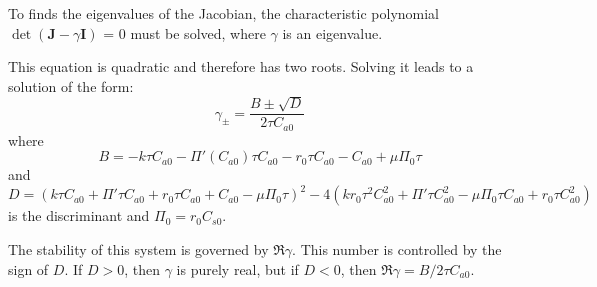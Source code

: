 To finds the eigenvalues of the Jacobian, the characteristic polynomial $\det(\bm{J} - \gamma \bm{I})$ = 0 must be solved, where $\gamma$ is an eigenvalue.

This equation is quadratic and therefore has two roots. Solving it leads to a solution of the form:
\begin{equation}
  \label{eq:eigenvalues_of_one_box_jac}
  \gamma_{\pm} = \frac{B \pm \sqrt{D}}{2\tau C_{a0}}
\end{equation}
where
\begin{equation}
  \label{eq:B_in_one_box}
  B = -k \tau  C_{a0}-\Pi'(C_{a0}) \tau  C_{a0}-r_0 \tau  C_{a0}-C_{a0}+\mu  \Pi_0 \tau
\end{equation}
and
\begin{equation}
  \label{eq:discriminant_from_one_box}
  D = \left(k \tau  C_{a0} +\Pi'\tau  C_{a0}+r_0 \tau  C_{a0}+C_{a0}-\mu  \Pi_0 \tau \right)^2-4 \left(k r_0 \tau ^2 C_{a0}^2+\Pi' \tau  C_{a0}^2-\mu  \Pi_0 \tau  C_{a0} +r_0 \tau  C_{a0}^2\right)
\end{equation}
is the discriminant and $\Pi_0 = r_0 C_{s0}$.

The stability of this system is governed by $\Re \gamma$. This number is controlled by the sign of $D$. If $D > 0$, then $\gamma$ is purely real, but if $D < 0$, then
$\Re \gamma = B / 2\tau C_{a0}$. 

